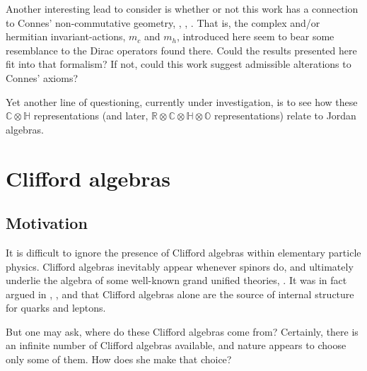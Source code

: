 \documentclass[letterpaper,12pt,titlepage,oneside,final]{book}
\newcommand{\CH}{\mathbb{C}\otimes\mathbb{H}}
\newcommand{\RCHO}{\mathbb{R}\otimes\mathbb{C}\otimes\mathbb{H}\otimes\mathbb{O}}
\begin{document}
Another interesting lead to consider is whether or not this work has a connection to Connes' non-commutative geometry, \cite{conneslott}, \cite{boylefar}, \cite{barrett}.  That is, the complex and/or hermitian invariant-actions, $m_c$ and $m_h$, introduced here seem to bear some resemblance to the Dirac operators found there.  Could the results presented here fit into that formalism?  If not, could this work suggest admissible alterations to Connes' axioms?


Yet another line of questioning, currently under investigation, is to see how these $\CH$ representations (and later, $\RCHO$ representations) relate to Jordan algebras.








\chapter{Clifford algebras\label{CA}  }

\section{Motivation  }

It is difficult to ignore the presence of Clifford algebras within elementary particle physics.  Clifford algebras inevitably appear whenever spinors do, and ultimately underlie the algebra of some well-known grand unified theories, \cite{agut}.  It was in fact argued in \cite{Grass}, \cite{wow}, and \cite{wowagain} that Clifford algebras alone are the source of internal structure for quarks and leptons.  




But one may ask, where do these Clifford algebras come from?   Certainly, there is an infinite number of Clifford algebras available, and nature appears to choose only some of them.  How does she make that choice?
\end{document}
